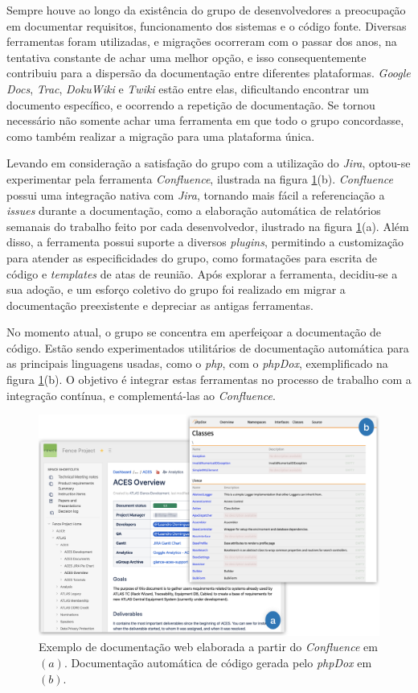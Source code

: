 Sempre houve ao longo da existência do grupo de desenvolvedores a preocupação em documentar requisitos, funcionamento dos sistemas e o código fonte. Diversas ferramentas foram utilizadas, e migrações ocorreram com o passar dos anos, na tentativa constante de achar uma melhor opção, e isso consequentemente contribuiu para a dispersão da documentação entre diferentes plataformas. \emph{Google Docs}, \emph{Trac}, \emph{DokuWiki} e \emph{Twiki} estão entre elas, dificultando encontrar um documento específico, e ocorrendo a repetição de documentação. Se tornou necessário não somente achar uma ferramenta em que todo o grupo concordasse, como também realizar a migração para uma plataforma única.

Levando em consideração a satisfação do grupo com a utilização do \emph{Jira}, optou-se experimentar pela ferramenta \emph{Confluence}, ilustrada na figura \ref{fig:centralizacao-docs}(b). \emph{Confluence} possui uma integração nativa com \emph{Jira}, tornando mais fácil a referenciação a \emph{issues} durante a documentação, como a elaboração automática de relatórios semanais do trabalho feito por cada desenvolvedor, ilustrado na figura \ref{fig:centralizacao-docs}(a). Além disso, a ferramenta possui suporte a diversos \emph{plugins}, permitindo a customização para atender as especificidades do grupo, como formatações para escrita de código e \emph{templates} de atas de reunião. Após explorar a ferramenta, decidiu-se a sua adoção, e um esforço coletivo do grupo foi realizado em migrar a documentação preexistente e depreciar as antigas ferramentas.

No momento atual, o grupo se concentra em aperfeiçoar a documentação de código. Estão sendo experimentados utilitários de documentação automática para as principais linguagens usadas, como o \emph{php}, com o \emph{phpDox}, exemplificado na figura \ref{fig:centralizacao-docs}(b). O objetivo é integrar estas ferramentas no processo de trabalho com a integração contínua, e complementá-las ao \emph{Confluence}.

\begin{figure}[H]
    \centering
    \includegraphics[width=15cm]{source/4-solucao/images/centralizacao-docs.png}
    \caption{Exemplo de documentação web elaborada a partir do \emph{Confluence} em $(a)$. Documentação automática de código gerada pelo \emph{phpDox} em $(b)$.}
    \label{fig:centralizacao-docs}
\end{figure}


